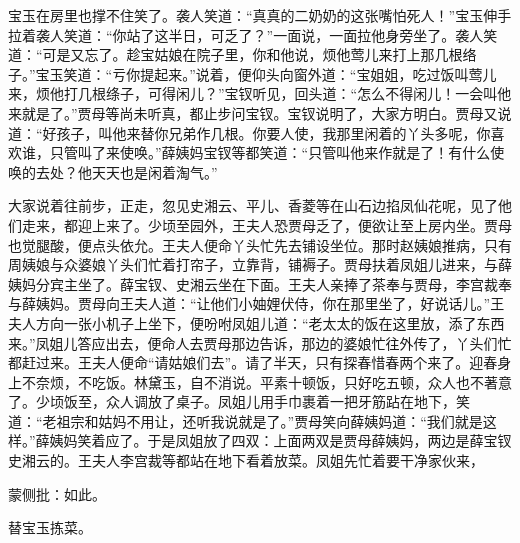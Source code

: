 \begin{parag}


    宝玉在房里也撑不住笑了。袭人笑道：“真真的二奶奶的这张嘴怕死人！”宝玉伸手拉着袭人笑道：“你站了这半日，可乏了？”一面说，一面拉他身旁坐了。袭人笑道：“可是又忘了。趁宝姑娘在院子里，你和他说，烦他莺儿来打上那几根络子。”宝玉笑道：“亏你提起来。”说着，便仰头向窗外道：“宝姐姐，吃过饭叫莺儿来，烦他打几根绦子，可得闲儿？”宝钗听见，回头道：“怎么不得闲儿！一会叫他来就是了。”贾母等尚未听真，都止步问宝钗。宝钗说明了，大家方明白。贾母又说道：“好孩子，叫他来替你兄弟作几根。你要人使，我那里闲着的丫头多呢，你喜欢谁，只管叫了来使唤。”薛姨妈宝钗等都笑道：“只管叫他来作就是了！有什么使唤的去处？他天天也是闲着淘气。”
\end{parag}


\begin{parag}


    大家说着往前步，正走，忽见史湘云、平儿、香菱等在山石边掐凤仙花呢，见了他们走来，都迎上来了。少顷至园外，王夫人恐贾母乏了，便欲让至上房内坐。贾母也觉腿酸，便点头依允。王夫人便命丫头忙先去铺设坐位。那时赵姨娘推病，只有周姨娘与众婆娘丫头们忙着打帘子，立靠背，铺褥子。贾母扶着凤姐儿进来，与薛姨妈分宾主坐了。薛宝钗、史湘云坐在下面。王夫人亲捧了茶奉与贾母，李宫裁奉与薛姨妈。贾母向王夫人道：“让他们小妯娌伏侍，你在那里坐了，好说话儿。”王夫人方向一张小机子上坐下，便吩咐凤姐儿道：“老太太的饭在这里放，添了东西来。”凤姐儿答应出去，便命人去贾母那边告诉，那边的婆娘忙往外传了，丫头们忙都赶过来。王夫人便命“请姑娘们去”。请了半天，只有探春惜春两个来了。迎春身上不奈烦，不吃饭。林黛玉，自不消说。平素十顿饭，只好吃五顿，众人也不著意了。少顷饭至，众人调放了桌子。凤姐儿用手巾裹着一把牙筋跕在地下，笑道：“老祖宗和姑妈不用让，还听我说就是了。”贾母笑向薛姨妈道：“我们就是这样。”薛姨妈笑着应了。于是凤姐放了四双：上面两双是贾母薛姨妈，两边是薛宝钗史湘云的。王夫人李宫裁等都站在地下看着放菜。凤姐先忙着要干净家伙来，\begin{note}蒙侧批：如此。\end{note}替宝玉拣菜。
\end{parag}


